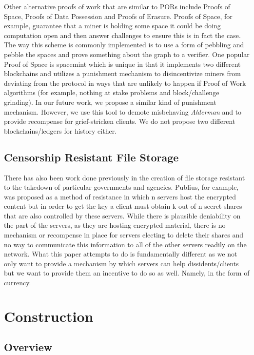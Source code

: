 \documentclass{article}
\begin{document}
Other alternative proofs of work that are similar to PORs include Proofs of Space, Proofs of Data Possession and Proofs of Erasure. Proofs of Space, for example, guarantee that a miner is holding some space it could be doing computation open and then answer challenges to ensure this is in fact the case. The way this scheme is commonly implemented is to use a form of pebbling and pebble the spaces and prove something about the graph to a verifier. One popular Proof of Space is spacemint which is unique in that it implements two different blockchains and utilizes a punishment mechanism to disincentivize miners from deviating from the protocol in ways that are unlikely to happen if Proof of Work algorithms (for example, nothing at stake problems and block/challenge grinding). In our future work, we propose a similar kind of punishment mechanism. However, we use this tool to demote misbehaving \emph{Alderman} and to provide recompense for grief-stricken clients. We do not propose two different blockchains/ledgers for history either.

\subsection{Censorship Resistant File Storage}
There has also been work done previously in the creation of file storage resistant to the takedown of particular governments and agencies. Publius, for example, was proposed as a method of resistance in which n servers host the encrypted content but in order to get the key a client must obtain k-out-of-n secret shares that are also controlled by these servers. While there is plausible deniability on the part of the servers, as they are hosting encrypted material, there is no mechanism or recompense in place for servers electing to delete their shares and no way to communicate this information to all of the other servers readily on the network. What this paper attempts to do is fundamentally different as we not only want to provide a mechanism by which servers can help dissidents/clients but we want to provide them an incentive to do so as well. Namely, in the form of currency. 

\section{Construction}

\subsection{Overview}
\end{document}
